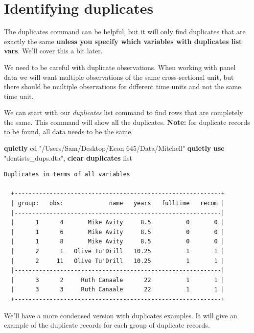 \documentclass[
]{book}
\newenvironment{Shaded}{\begin{snugshade}}{\end{snugshade}}
\newcommand{\KeywordTok}[1]{\textcolor[rgb]{0.13,0.29,0.53}{\textbf{#1}}}
\newcommand{\NormalTok}[1]{#1}
\newcommand{\OtherTok}[1]{\textcolor[rgb]{0.56,0.35,0.01}{#1}}
\newcommand{\StringTok}[1]{\textcolor[rgb]{0.31,0.60,0.02}{#1}}
\begin{document}
\section{Identifying duplicates}\label{identifying-duplicates}

The duplicates command can be helpful, but it will only find duplicates that are exactly the same \textbf{unless you specify which variables with duplicates list vars}.
We'll cover this a bit later.

We need to be careful with duplicate observations. When working with panel data we will want multiple observations of the same cross-sectional unit, but there should be multiple observations for different time units and not the same time unit.

We can start with our \emph{duplicates} list command to find rows that are completely the same. This command will show all the duplicates. \textbf{Note:} for duplicate records to be found, all data needs to be the same.

\begin{Shaded}
\begin{Highlighting}[]
\KeywordTok{quietly}\NormalTok{ cd }\StringTok{"/Users/Sam/Desktop/Econ 645/Data/Mitchell"}
\KeywordTok{quietly} \KeywordTok{use} \StringTok{"dentists\_dups.dta"}\NormalTok{, }\KeywordTok{clear}
\KeywordTok{duplicates} \OtherTok{list}
\end{Highlighting}
\end{Shaded}

\begin{verbatim}
Duplicates in terms of all variables

  +-----------------------------------------------------------+
  | group:   obs:             name   years   fulltime   recom |
  |-----------------------------------------------------------|
  |      1      4       Mike Avity     8.5          0       0 |
  |      1      6       Mike Avity     8.5          0       0 |
  |      1      8       Mike Avity     8.5          0       0 |
  |      2      1   Olive Tu'Drill   10.25          1       1 |
  |      2     11   Olive Tu'Drill   10.25          1       1 |
  |-----------------------------------------------------------|
  |      3      2     Ruth Canaale      22          1       1 |
  |      3      3     Ruth Canaale      22          1       1 |
  +-----------------------------------------------------------+
\end{verbatim}

We'll have a more condensed version with duplicates examples. It will give an
example of the duplicate records for each group of duplicate records.
\end{document}
